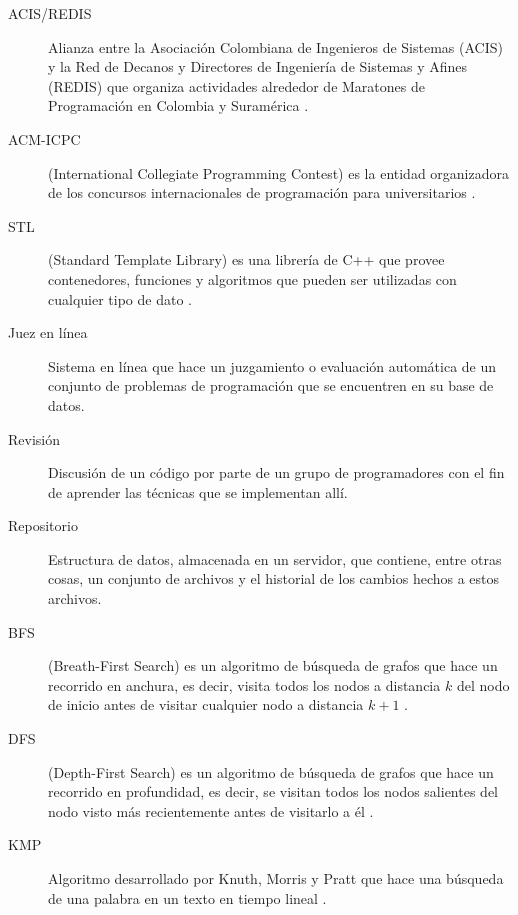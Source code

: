 \documentclass[11pt, oneside]{article}
\theoremstyle{definition}
\theoremstyle{remark}
\begin{document}
\begin{description}
	\item[ACIS/REDIS] Alianza entre la Asociación Colombiana de Ingenieros de Sistemas (ACIS) y la Red de Decanos y Directores de Ingeniería de Sistemas y Afines (REDIS) que organiza actividades alrededor de Maratones de Programación en Colombia y Suramérica \cite{ACIS}.
	\item[ACM-ICPC] (International Collegiate Programming Contest) es la entidad organizadora de los concursos internacionales de programación para universitarios \cite{ICPC}.
	\item[STL] (Standard Template Library) es una librería de C++ que provee contenedores, funciones y algoritmos que pueden ser utilizadas con cualquier tipo de dato \cite{C++}.
	\item[Juez en línea] Sistema en línea que hace un juzgamiento o evaluación automática de un conjunto de problemas de programación que se encuentren en su base de datos.
	\item[Revisión] Discusión de un código por parte de un grupo de programadores con el fin de aprender las técnicas que se implementan allí.
	\item[Repositorio] Estructura de datos, almacenada en un servidor, que contiene, entre otras cosas, un conjunto de archivos y el historial de los cambios hechos a estos archivos.
	\item[BFS] (Breath-First Search) es un algoritmo de búsqueda de grafos que hace un recorrido en anchura, es decir, visita todos los nodos a distancia $k$ del nodo de inicio antes de visitar cualquier nodo a distancia $k+1$ \cite{Cormen}.
	\item[DFS] (Depth-First Search) es un algoritmo de búsqueda de grafos que hace un recorrido en profundidad, es decir, se visitan todos los nodos salientes del nodo visto más recientemente antes de visitarlo a él \cite{Cormen}.
	\item[KMP] Algoritmo desarrollado por Knuth, Morris y Pratt que hace una búsqueda de una palabra en un texto en tiempo lineal \cite{Cormen}.
\end{description}






\end{document}
